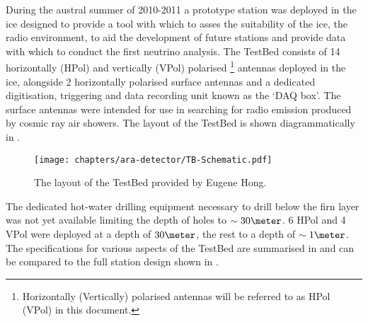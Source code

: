 During the austral summer of 2010-2011 a prototype station was deployed in the ice designed to provide a tool with which to asses the suitability of the ice, the radio environment, to aid the development of future stations and provide data with which to conduct the first neutrino analysis. The TestBed consists of 14 horizontally (HPol) and vertically (VPol) polarised \footnote{Horizontally (Vertically) polarised antennas will be referred to as HPol (VPol) in this document.} antennas deployed in the ice, alongside 2 horizontally polarised surface antennas and a dedicated digitisation, triggering and data recording unit known as the `DAQ box'. The surface antennas were intended for use in searching for radio emission produced by cosmic ray air showers. The layout of the TestBed is shown diagrammatically in .

\begin{figure}[htpb]
  \centering
  \texttt{[image: chapters/ara-detector/TB-Schematic.pdf]}
  \caption{The layout of the TestBed provided by Eugene Hong.}
  \label{fig:ara-detector:TestBed:Schematic}
\end{figure}

The dedicated hot-water drilling equipment necessary to drill below the firn layer was not yet available limiting the depth of holes to $\sim 30 \meter$. 6 HPol and 4 VPol were deployed at a depth of $30 \meter$, the rest to a depth of $\sim 1 \meter$. The specifications for various aspects of the TestBed are summarised in  and can be compared to the full station design shown in .


